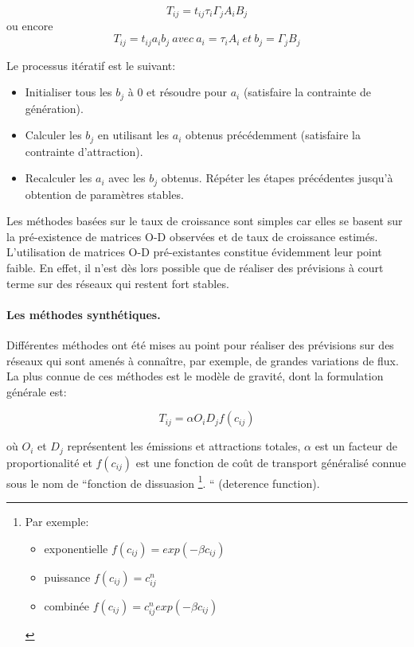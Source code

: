 \begin{center}
$$T_{ij} = t_{ij}\tau_i\Gamma_jA_iB_j$$
ou encore
$$T_{ij} = t_{ij}a_ib_j ~avec~ a_i = \tau_iA_i ~et~ b_j = \Gamma_jB_j$$
\end{center}

Le processus itératif est le suivant:


\begin{itemize}
\item Initialiser tous les $b_j$ à 0 et résoudre pour $a_i$ (satisfaire la
contrainte de génération).
\item Calculer les $b_j$ en utilisant les $a_i$ obtenus précédemment
(satisfaire la contrainte d'attraction).
\item Recalculer les $a_i$ avec les $b_j$ obtenus. Répéter les étapes
précédentes jusqu'à obtention de paramètres stables.%
\end{itemize}


Les méthodes basées sur le taux de croissance sont simples car
elles se basent sur la pré-existence de matrices O-D observées et
de taux de croissance estimés. L'utilisation de matrices O-D
pré-existantes constitue évidemment leur point faible. En effet, il
n'est dès lors possible que de réaliser des prévisions à court
terme sur des réseaux qui restent fort stables.



\paragraph{Les méthodes synthétiques.}


Différentes méthodes ont été mises au point pour réaliser des prévisions sur des
réseaux qui sont amenés à connaître, par exemple, de grandes variations de flux.
La plus connue de ces méthodes est le modèle de gravité, dont la formulation
générale est:


$$T_{ij} = \alpha O_iD_jf(c_{ij})$$


où $O_i$ et $D_j$ représentent les émissions et attractions totales, $\alpha$
est un facteur de proportionalité et $f(c_{ij})$ est une fonction de coût de
transport généralisé connue sous le nom de ``fonction de dissuasion
\footnote{Par exemple:
\begin{itemize}
\item exponentielle $f(c_{ij}) = exp(-\beta c_{ij})$
\item puissance $f(c_{ij}) = c_{ij}^n$
\item combinée $f(c_{ij}) = c_{ij}^nexp(-\beta c_{ij})$
\end{itemize} }.
`` (deterence function).

